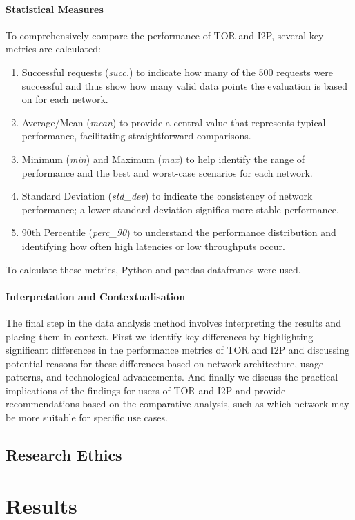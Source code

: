 \documentclass[12pt,conference]{IEEEtran}
\begin{document}
\paragraph{Statistical Measures}
To comprehensively compare the performance of TOR and I2P, several key metrics are calculated:
\begin{enumerate}
	\item Successful requests (\textit{succ.}) to indicate how many of the 500 requests were successful and thus show how many valid data points the evaluation is based on for each network.
	\item Average/Mean (\textit{mean}) to provide a central value that represents typical performance, facilitating straightforward comparisons.
	\item Minimum (\textit{min}) and Maximum (\textit{max}) to help identify the range of performance and the best and worst-case scenarios for each network.
	\item Standard Deviation (\textit{std\_dev}) to indicate the consistency of network performance; a lower standard deviation signifies more stable performance.
	\item 90th Percentile (\textit{perc\_90}) to understand the performance distribution and identifying how often high latencies or low throughputs occur.
\end{enumerate}
To calculate these metrics, Python and pandas dataframes were used.
\paragraph{Interpretation and Contextualisation}
The final step in the data analysis method involves interpreting the results and placing them in context. First we identify key differences by highlighting significant differences in the performance metrics of TOR and I2P and discussing potential reasons for these differences based on network architecture, usage patterns, and technological advancements. And finally we discuss the practical implications of the findings for users of TOR and I2P and provide recommendations based on the comparative analysis, such as which network may be more suitable for specific use cases.

\subsection{Research Ethics}

\newpage
\section{Results}
\end{document}
